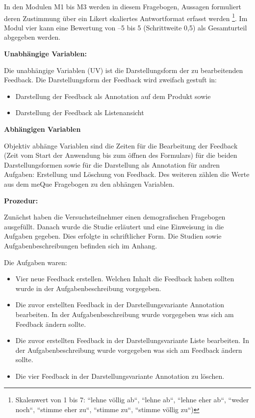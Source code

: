 In den Modulen M1 bis M3 werden in diesem Fragebogen, Aussagen formuliert deren Zustimmung über ein Likert skaliertes Antwortformat erfasst werden \footnote{Skalenwert von 1 bis 7: ``lehne völlig ab``, ``lehne ab``, ``lehne eher ab``, ``weder
	noch``, ``stimme eher zu``, ``stimme zu``, ``stimme völlig zu``)}\cite{Minge2013}. Im Modul vier kann eine Bewertung von –5 bis 5 (Schrittweite 0,5) als Gesamturteil abgegeben werden. 

\textbf{Unabhängige Variablen:}

Die unabhängige Variablen (UV) ist die Darstellungsform der zu bearbeitenden Feedback. Die Darstellungsform der Feedback wird zweifach gestuft in: 

\begin{itemize}
\item Darstellung der Feedback als Annotation auf dem Produkt sowie
\item Darstellung der Feedback als Listenansicht 
\end{itemize}

\textbf{Abhängigen Variablen}

Objektiv abhänge Variablen sind die Zeiten für die Bearbeitung der Feedback (Zeit vom Start der Anwendung bis zum öffnen des Formulars) für die beiden Darstellungsformen sowie für die Darstellung als Annotation für andren Aufgaben: Erstellung und Löschung von Feedback. Des weiteren zählen die Werte aus dem meQue Fragebogen zu den abhängen Variablen.

\textbf{Prozedur:}

Zunächst haben die Versuchsteilnehmer einen demografischen Fragebogen ausgefüllt. Danach wurde die Studie erläutert und eine Einweisung in die Aufgaben gegeben. 
Dies erfolgte in schriftlicher Form. Die Studien sowie Aufgabenbeschreibungen befinden sich im Anhang. 

Die Aufgaben waren: 

\begin{itemize}
	\item Vier neue Feedback erstellen. Welchen Inhalt die Feedback haben sollten wurde in der Aufgabenbeschreibung vorgegeben. 
	\item Die zuvor erstellten Feedback in der Darstellungsvariante Annotation bearbeiten. In der Aufgabenbeschreibung wurde vorgegeben was sich am Feedback ändern sollte.
	\item Die zuvor erstellten Feedback in der Darstellungsvariante Liste bearbeiten. In der Aufgabenbeschreibung wurde vorgegeben was sich am Feedback ändern sollte.
	\item Die vier Feedback in der Darstellungsvariante Annotation zu löschen.
\end{itemize}

